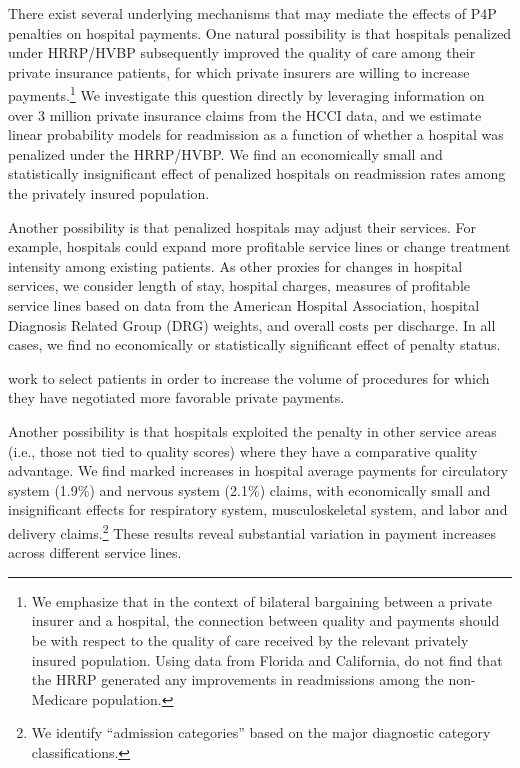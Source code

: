 \documentclass[12pt]{article}
\begin{document}
There exist several underlying mechanisms that may mediate the effects of P4P penalties on hospital payments. One natural possibility is that hospitals penalized under HRRP/HVBP subsequently improved the quality of care among their private insurance patients, for which private insurers are willing to increase payments.\footnote{We emphasize that in the context of bilateral bargaining between a private insurer and a hospital, the connection between quality and payments should be with respect to the quality of care received by the relevant privately insured population. Using data from Florida and California, \cite{demiralp2017} do not find that the HRRP generated any improvements in readmissions among the non-Medicare population.} We investigate this question directly by leveraging information on over 3 million private insurance claims from the HCCI data, and we estimate linear probability models for readmission as a function of whether a hospital was penalized under the HRRP/HVBP. We find an economically small and statistically insignificant effect of penalized hospitals on readmission rates among the privately insured population.

Another possibility is that penalized hospitals may adjust their services. For example, hospitals could expand more profitable service lines or change treatment intensity among existing patients. As other proxies for changes in hospital services, we consider length of stay, hospital charges, measures of profitable service lines based on data from the American Hospital Association, hospital Diagnosis Related Group (DRG) weights, and overall costs per discharge. In all cases, we find no economically or statistically significant effect of penalty status.










work to select patients in order to increase the volume of procedures for which they have negotiated more favorable private payments.











Another possibility is that hospitals exploited the penalty in other service areas (i.e., those not tied to quality scores) where they have a comparative quality advantage.  We find marked increases in hospital average payments for circulatory system (1.9$\%$) and nervous system (2.1$\%$) claims, with economically small and insignificant effects for respiratory system, musculoskeletal system, and labor and delivery claims.\footnote{We identify ``admission categories'' based on the major diagnostic category classifications.}  These results reveal substantial variation in payment increases across different service lines.
\end{document}
